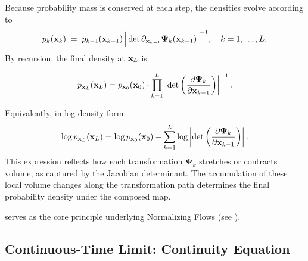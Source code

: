 Because probability mass is conserved at each step, the densities evolve according to
\[
p_{k}({\mathbf{x}}_k) \;=\; p_{k-1}({\mathbf{x}}_{k-1}) \,
   \Big|\det \partial_{{\mathbf{x}}_{k-1}} \bm{\Psi}_k({\mathbf{x}}_{k-1})\Big|^{-1},
   \quad k=1,\dots,L.
\]
By recursion, the final density at ${\mathbf{x}}_L$ is
\begin{mdframed}
\begin{align}\label{eq:cov-multi-layer-nolog}
    p_{{\mathbf{x}}_L}({\mathbf{x}}_L) 
    = p_{{\mathbf{x}}_0}({\mathbf{x}}_0) 
    \cdot \prod_{k=1}^L \left| \det \left( \frac{\partial \bm{\Psi}_k}{\partial {\mathbf{x}}_{k-1}} \right) \right|^{-1}.
\end{align}
\end{mdframed}
Equivalently, in log-density form:
\begin{align*}
    \log p_{{\mathbf{x}}_L}({\mathbf{x}}_L) 
    = \log p_{{\mathbf{x}}_0}({\mathbf{x}}_0) 
    - \sum_{k=1}^L \log \left| \det \left( \frac{\partial \bm{\Psi}_k}{\partial {\mathbf{x}}_{k-1}} \right) \right|.
\end{align*}
This expression reflects how each transformation $\bm{\Psi}_k$ stretches or contracts volume, as captured by the Jacobian determinant. The accumulation of these local volume changes along the transformation path determines the final probability density under the composed map.

 serves as the core principle underlying Normalizing Flows (see ).

\clearpage
\newpage

\subsection{Continuous-Time Limit: Continuity Equation}\label{subsec:cov-continuity-eq} 



